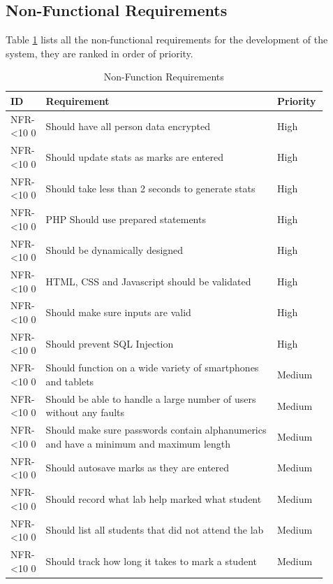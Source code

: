 \documentclass[12pt]{article}  %
\newcommand{\rid}[1]{\centering #1-\ifnum\value{requirement}<10 0\fi\arabic{requirement} \stepcounter{requirement}}
\begin{document}
\newpage
\subsection{Non-Functional Requirements}

Table \ref{table:non-func} lists all the non-functional requirements for the development of the system, they are ranked in order of priority.

\begin{spacing}{1.5}
\begin{longtable}{|p{0.1\linewidth}|p{0.7\linewidth}|p{0.1\linewidth}|}
\caption{Non-Function Requirements} \label{table:non-func}\\
\hline
\textbf{ID} & \textbf{Requirement} & \textbf{Priority}\\
\hline \hline


\rid{NFR} & Should have all person data encrypted & High\\ \hline
\rid{NFR} & Should update stats as marks are entered & High\\ \hline
\rid{NFR} & Should take less than 2 seconds to generate stats  & High\\ \hline
\rid{NFR} & PHP Should use prepared statements & High\\ \hline
\rid{NFR} & Should be dynamically designed & High\\ \hline
\rid{NFR} & HTML, CSS and Javascript should be validated & High\\ \hline
\rid{NFR} & Should make sure inputs are valid & High\\ \hline
\rid{NFR} & Should prevent SQL Injection & High\\ \hline


\rid{NFR} & Should function on a wide variety of smartphones and tablets & Medium\\ \hline
\rid{NFR} & Should be able to handle a large number of users without any faults & Medium\\ \hline
\rid{NFR} & Should make sure passwords contain alphanumerics and have a minimum and maximum length  & Medium\\ \hline
\rid{NFR} & Should autosave marks as they are entered & Medium\\ \hline
\rid{NFR} & Should record what lab help marked what student & Medium\\ \hline
\rid{NFR} & Should list all students that did not attend the lab & Medium\\ \hline
\rid{NFR} & Should track how long it takes to mark a student & Medium \\ \hline



\end{longtable}
\end{spacing}
\end{document}
